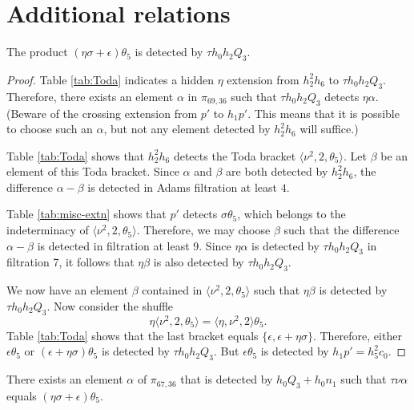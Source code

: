 \section{Additional relations}

\begin{lemma}
\label{lem:nubar-h5^2}
The product $(\eta \sigma + \epsilon) \theta_5$ is detected by
$\tau h_0 h_2 Q_3$.
\end{lemma}

\begin{proof}
Table \ref{tab:Toda} indicates a hidden
$\eta$ extension from $h_2^2 h_6$ to $\tau h_0 h_2 Q_3$.
Therefore, there exists an element $\alpha$ in $\pi_{69,36}$
such that $\tau h_0 h_2 Q_3$ detects $\eta \alpha$.
(Beware of the crossing extension from $p'$ to $h_1 p'$.
This means that it is possible to choose such an $\alpha$, but not
any element detected by $h_2^2 h_6$ will suffice.)

Table \ref{tab:Toda} shows that $h_2^2 h_6$ detects the
Toda bracket $\langle \nu^2, 2, \theta_5 \rangle$.
Let $\beta$ be an element of this Toda bracket.
Since $\alpha$ and $\beta$ are both detected by $h_2^2 h_6$, 
the difference $\alpha - \beta$ is
detected in Adams filtration at least $4$.

Table \ref{tab:misc-extn} shows that
$p'$ detects $\sigma \theta_5$, which belongs to the 
indeterminacy of $\langle \nu^2, 2, \theta_5 \rangle$.
Therefore, we may choose $\beta$ such that
the difference $\alpha - \beta$
is detected in filtration at least 9.
Since $\eta \alpha$ is detected by $\tau h_0 h_2 Q_3$ in filtration 7,
it follows that $\eta \beta$ is also detected by $\tau h_0 h_2 Q_3$.

We now have an element $\beta$ contained in
$\langle \nu^2, 2, \theta_5 \rangle$ such that
$\eta \beta$ is detected by $\tau h_0 h_2 Q_3$.
Now consider the shuffle
\[
\eta \langle \nu^2, 2, \theta_5 \rangle =
\langle \eta, \nu^2, 2 \rangle \theta_5.
\]
Table \ref{tab:Toda} shows that the last bracket equals
$\{ \epsilon, \epsilon + \eta \sigma \}$.
Therefore, either
$\epsilon \theta_5$ or
$(\epsilon + \eta \sigma) \theta_5$ is detected by
$\tau h_0 h_2 Q_3$.
But $\epsilon \theta_5$ is detected by $h_1 p' = h_5^2 c_0$.
\end{proof}

\begin{lemma}
\label{lem:compound-(epsilon+etasigma)-theta5}
There exists an element $\alpha$ of $\pi_{67,36}$ that is 
detected by $h_0 Q_3 + h_0 n_1$ such that
$\tau \nu \alpha$ equals $(\eta \sigma + \epsilon) \theta_5$.
\end{lemma}

